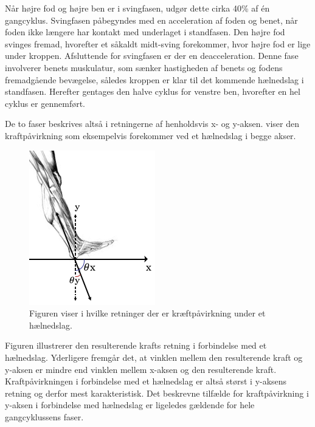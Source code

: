 Når højre fod og højre ben er i svingfasen, udgør dette cirka 40\% af én gangcyklus. Svingfasen påbegyndes med en acceleration af foden og benet, når foden ikke længere har kontakt med underlaget i standfasen. Den højre fod svinges fremad, hvorefter et såkaldt midt-sving forekommer, hvor højre fod er lige under kroppen. Afsluttende for svingfasen er der en deacceleration. Denne fase involverer benets muskulatur, som sænker hastigheden af benets og fodens fremadgående bevægelse, således kroppen er klar til det kommende hælnedslag i standfasen. Herefter gentages den halve cyklus for venstre ben, hvorefter en hel cyklus er gennemført.\citep{VaughanDavisOConnor1992,Whittle1990}

De to faser beskrives altså i retningerne af henholdsvis x- og y-aksen.  viser den kraftpåvirkning som eksempelvis forekommer ved et hælnedslag i begge akser.  
\begin{figure}[H]
	\centering
	\includegraphics[scale=0.7]{figures/bProblemloesning/kraefter_akser.png}
	\caption{Figuren viser i hvilke retninger der er kræftpåvirkning under et hælnedslag.}
	\label{fig:kraefter_akser}
\end{figure} %
Figuren illustrerer den resulterende krafts retning i forbindelse med et hælnedslag. Yderligere fremgår det, at vinklen mellem den resulterende kraft og y-aksen er mindre end vinklen mellem x-aksen og den resulterende kraft. Kraftpåvirkningen i forbindelse med et hælnedslag er altså størst i y-aksens retning og derfor mest karakteristisk. Det beskrevne tilfælde for kraftpåvirkning i y-aksen i forbindelse med hælnedslag er ligeledes gældende for hele gangcyklussens faser. \citep{Rueterbories2010,Serway2010,ClelandKikhia2013} \newline
